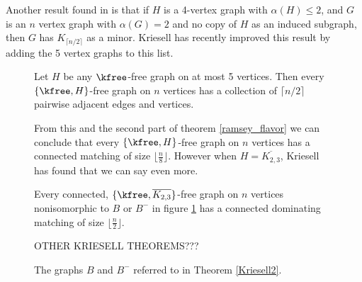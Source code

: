 Another result found in \cite{PST} is that if $H$ is a 4-vertex graph with $\alpha(H) \leq 2$, and $G$ is an $n$ vertex graph with $\alpha(G) =2$ and no copy of $H$ as an induced subgraph, then $G$ has $K_{\lceil n/2 \rceil}$ as a minor.  Kriesell has recently improved this result by adding the 5 vertex graphs to this list.
\begin{figure}
	\begin{center}
	\hspace{1.5cm}
	
	\end{center}
	\caption{The graphs $B$ and $B^-$ referred to in Theorem \ref{Kriesell2}.}
	\label{B_B}
\begin{theorem}
	Let $H$ be any $\kfree$-free graph on at most 5 vertices.  Then every $\{\kfree, H\}$-free graph on $n$ vertices has a collection of $\lceil n/2 \rceil$ pairwise adjacent edges and vertices.
	\end{theorem}
From this and the second part of theorem  \ref{ramsey_flavor} we can conclude that every $\{\kfree, H\}$-free graph on $n$ vertices has a connected matching of size $\lfloor \frac{n}{8} \rfloor$. However when $H = \overline{K_{2,3}}$, Kriesell has found that we can say even more.
\begin{theorem}
	Every connected, $\{\kfree, \overline{K_{2,3}}\}$-free graph on $n$ vertices nonisomorphic to $B$ or $B^-$ in figure \ref{B_B} has a connected dominating matching of size $\lfloor \frac{n}{2} \rfloor$.
\end{theorem}
OTHER KRIESELL THEOREMS???
\end{figure}
